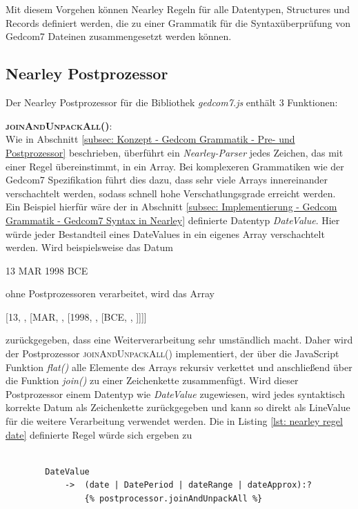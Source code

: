 \\ \\ 
Mit diesem Vorgehen können Nearley Regeln für alle Datentypen, Structures und Records definiert werden, die zu einer Grammatik für die Syntaxüberprüfung von Gedcom7 Dateinen zusammengesetzt werden können.


\subsection{Nearley Postprozessor}
\label{subsec: Implementierung - Gedcom Grammatik - Nearley Postprozessoren}
Der Nearley Postprozessor für die Bibliothek \textit{gedcom7.js} enthält 3 Funktionen: 

\vspace{1em}
\textsc{\textbf{joinAndUnpackAll()}:} \vspace{0.5em} \\
Wie in Abschnitt \ref{subsec: Konzept - Gedcom Grammatik - Pre- und Postprozessor} beschrieben, überführt ein \textit{Nearley-Parser} jedes Zeichen, das mit einer Regel übereinstimmt, in ein Array. Bei komplexeren Grammatiken wie der Gedcom7 Spezifikation führt dies dazu, dass sehr viele Arrays innereinander verschachtelt werden, sodass schnell hohe Verschatlungsgrade erreicht werden. Ein Beispiel hierfür wäre der in Abschnitt \ref{subsec: Implementierung - Gedcom Grammatik - Gedcom7 Syntax in Nearley} definierte Datentyp \textit{DateValue}. Hier würde jeder Bestandteil eines DateValues in ein eigenes Array verschachtelt werden. Wird beispielsweise das Datum 
\begin{center}
	13 MAR 1998 BCE
\end{center}
ohne Postprozessoren verarbeitet, wird das Array
\begin{center}
	[13, , [MAR, , [1998, , [BCE, , ]]]]
\end{center}
zurückgegeben, dass eine Weiterverarbeitung sehr umständlich macht. Daher wird der Postprozessor \textsc{joinAndUnpackAll()} implementiert, der über die JavaScript Funktion \textit{flat()} alle Elemente des Arrays rekursiv verkettet und anschließend über die Funktion \textit{join()} zu einer Zeichenkette zusammenfügt. Wird dieser Postprozessor einem Datentyp wie \textit{DateValue} zugewiesen, wird jedes syntaktisch korrekte Datum als Zeichenkette zurückgegeben und kann so direkt als LineValue für die weitere Verarbeitung verwendet werden. Die in Listing \ref{lst: nearley regel date} definierte Regel würde sich ergeben zu
\\ \\
\begin{minipage}{1.0\textwidth} \small
	\begin{lstlisting}
		DateValue   
			->  (date | DatePeriod | dateRange | dateApprox):?
				{% postprocessor.joinAndUnpackAll %}
	\end{lstlisting}
	\label{lst: nearley regel date mit postprozessor}
\end{minipage}
\\ \\

